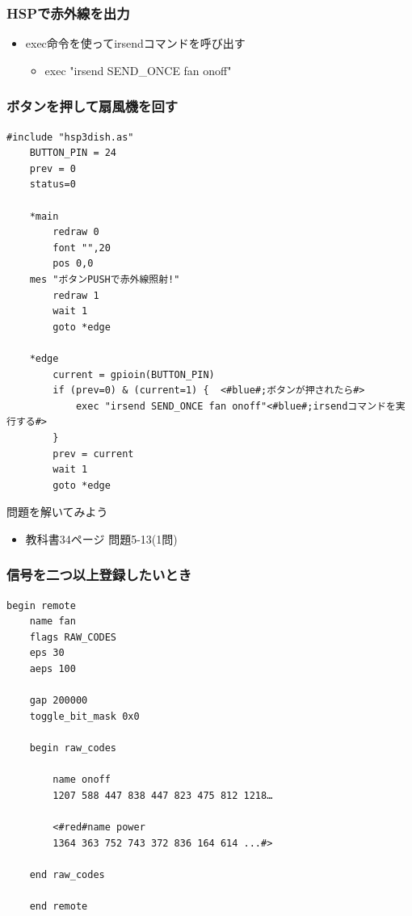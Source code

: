 \documentclass[slide05.tex]{subfiles}
\begin{document}
\begin{frame}
    \frametitle{HSPで赤外線を出力}
    \begin{itemize}
        \item exec命令を使ってirsendコマンドを呼び出す
        \begin{itemize}
            \item exec "irsend SEND\_ONCE fan onoff" 
        \end{itemize}
    \end{itemize}
\end{frame}

\begin{frame}[fragile]
    \frametitle{ボタンを押して扇風機を回す}
    \begin{lstlisting}[title=\textasciitilde/05/ir.hsp]
    #include "hsp3dish.as"
    BUTTON_PIN = 24
    prev = 0
    status=0

    *main
        redraw 0 
        font "",20
        pos 0,0
    mes "ボタンPUSHで赤外線照射!"
        redraw 1
        wait 1
        goto *edge

    *edge
        current = gpioin(BUTTON_PIN)
        if (prev=0) & (current=1) {	 <#blue#;ボタンが押されたら#>
            exec "irsend SEND_ONCE fan onoff"<#blue#;irsendコマンドを実行する#>
        }
        prev = current
        wait 1
        goto *edge
    \end{lstlisting}
\end{frame}

\begin{frame}
    \begin{exampleblock}{問題を解いてみよう}
    \begin{itemize}
        \item 教科書34ページ 問題5-13(1問)
    \end{itemize}
    \end{exampleblock}
\end{frame}

\begin{frame}[fragile]
    \frametitle{信号を二つ以上登録したいとき}
    \begin{lstlisting}[title=２つの信号を登録するときのtemplate.lircd.conf,label=２つの信号を登録するときのtemplate.lircd.conf]
    begin remote
    name fan
    flags RAW_CODES
    eps 30
    aeps 100

    gap 200000
    toggle_bit_mask 0x0

    begin raw_codes

        name onoff
        1207 588 447 838 447 823 475 812 1218…

        <#red#name power
        1364 363 752 743 372 836 164 614 ...#>

    end raw_codes

    end remote
    \end{lstlisting}
\end{frame}
\end{document}

